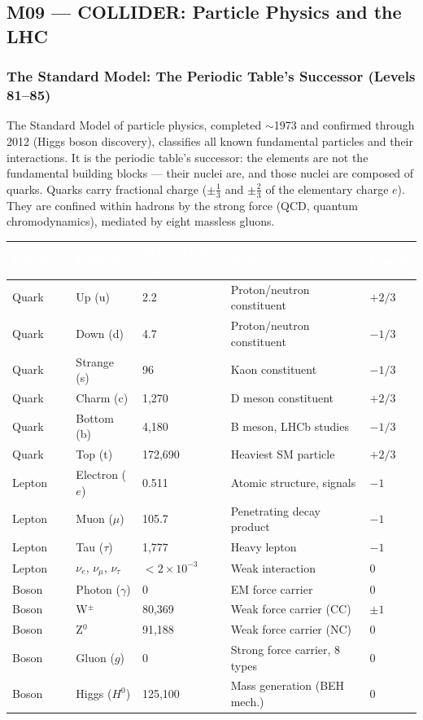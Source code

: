 \documentclass[11pt,letterpaper]{article}
\newcommand{\tableheader}[1]{\textbf{\sffamily\textcolor{white}{#1}}}
\begin{document}
\subsection{M09 --- COLLIDER: Particle Physics and the LHC}

\subsubsection{The Standard Model: The Periodic Table's Successor (Levels 81--85)}

The Standard Model of particle physics, completed $\sim$1973 and confirmed through 2012 (Higgs
boson discovery), classifies all known fundamental particles and their interactions. It is the
periodic table's successor: the elements are not the fundamental building blocks --- their nuclei
are, and those nuclei are composed of quarks. Quarks carry fractional charge ($\pm\frac{1}{3}$
and $\pm\frac{2}{3}$ of the elementary charge $e$). They are confined within hadrons by the strong
force (QCD, quantum chromodynamics), mediated by eight massless gluons.

\begin{center}
\begin{tabularx}{\textwidth}{L{2cm}L{2.2cm}L{2.8cm}XC{1.5cm}}
\toprule
{}
\tableheader{Category} & \tableheader{Particle} & \tableheader{Mass (MeV/$c^2$)} & \tableheader{Role} & \tableheader{Charge} \\
\midrule
Quark & Up (u) & 2.2 & Proton/neutron constituent & $+2/3$ \\
Quark & Down (d) & 4.7 & Proton/neutron constituent & $-1/3$ \\
Quark & Strange (s) & 96 & Kaon constituent & $-1/3$ \\
Quark & Charm (c) & 1,270 & D meson constituent & $+2/3$ \\
Quark & Bottom (b) & 4,180 & B meson, LHCb studies & $-1/3$ \\
Quark & Top (t) & 172,690 & Heaviest SM particle & $+2/3$ \\
Lepton & Electron ($e$) & 0.511 & Atomic structure, signals & $-1$ \\
Lepton & Muon ($\mu$) & 105.7 & Penetrating decay product & $-1$ \\
Lepton & Tau ($\tau$) & 1,777 & Heavy lepton & $-1$ \\
Lepton & $\nu_e$, $\nu_\mu$, $\nu_\tau$ & $< 2 \times 10^{-3}$ & Weak interaction & 0 \\
Boson & Photon ($\gamma$) & 0 & EM force carrier & 0 \\
Boson & W$^\pm$ & 80,369 & Weak force carrier (CC) & $\pm 1$ \\
Boson & Z$^0$ & 91,188 & Weak force carrier (NC) & 0 \\
Boson & Gluon ($g$) & 0 & Strong force carrier, 8 types & 0 \\
Boson & Higgs ($H^0$) & 125,100 & Mass generation (BEH mech.) & 0 \\
\bottomrule
\end{tabularx}
\end{center}
\end{document}
